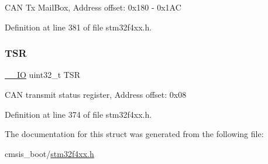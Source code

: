 C\+AN Tx Mail\+Box, Address offset\+: 0x180 -\/ 0x1\+AC 

Definition at line 381 of file stm32f4xx.\+h.

\mbox{\label{struct_c_a_n___type_def_a87e3001757a0cd493785f1f3337dd0e8}} 
\subsubsection{\texorpdfstring{T\+SR}{TSR}}
{\footnotesize\ttfamily \hyperlink{group___c_m_s_i_s__core__definitions_gaec43007d9998a0a0e01faede4133d6be}{\+\_\+\+\_\+\+IO} uint32\+\_\+t T\+SR}

C\+AN transmit status register, Address offset\+: 0x08 

Definition at line 374 of file stm32f4xx.\+h.



The documentation for this struct was generated from the following file\+:\begin{DoxyCompactItemize}
\item 
cmsis\+\_\+boot/\hyperlink{stm32f4xx_8h}{stm32f4xx.\+h}\end{DoxyCompactItemize}
